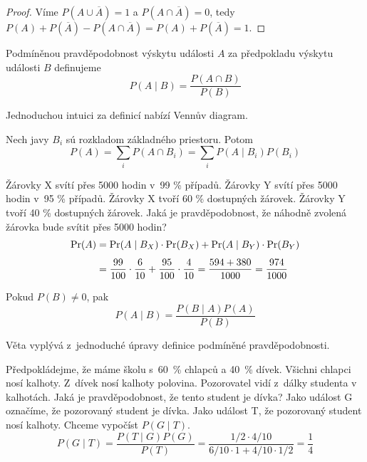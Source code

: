 {\begin{proof}
    Víme $P(A \cup \overline{A}) = 1$ a $P(A \cap \overline{A}) = 0$,
	tedy $P(A) + P(\overline{A}) - P(A \cap \overline{A}) = P(A) + P(\overline{A}) = 1$.
\end{proof}

\begin{definition}
Podmíněnou pravděpodobnost výskytu události $A$ za předpokladu výskytu
události $B$ definujeme
\[
    P(A \mid B) = \frac{P(A \cap B)}{P(B)}
\]
\end{definition}

Jednoduchou intuici za definicí nabízí Vennův diagram.

\begin{theorem}
	Nech javy $B_i$ sú rozkladom základného priestoru. Potom
    \[
        P(A) = \sum_i P(A \cap B_i) = \sum_i P(A \mid B_i) P(B_i)
    \]
\end{theorem}

\begin{example}
    Žárovky X svítí přes 5000 hodin v~99 \% případů.
    Žárovky Y svítí přes 5000 hodin v~95 \% případů.
    Žárovky X tvoří 60 \% dostupných žárovek.
    Žárovky Y tvoří 40 \% dostupných žárovek.
    Jaká je pravděpodobnost, že náhodně zvolená žárovka
    bude svítit přes 5000 hodin?
    \[
{\displaystyle {\begin{aligned}\Pr(A)&=\Pr(A\mid B_{X})\cdot \Pr(B_{X})+\Pr(A\mid B_{Y})\cdot \Pr(B_{Y})\\[4pt]&={99 \over 100}\cdot {6 \over 10}+{95 \over 100}\cdot {4 \over 10}={{594+380} \over 1000}={974 \over 1000}\end{aligned}}}
\]
\end{example}

\begin{theorem}[Bayes]
    Pokud $P(B) \neq 0$, pak
    \[
    P(A \mid B) = \frac{P(B \mid A)P(A)}{P(B)}
    \]
\end{theorem}

Věta vyplývá z~jednoduché úpravy definice podmíněné pravděpodobnosti.

\begin{example}
Předpokládejme, že máme školu s~60~\% chlapců
a 40~\% dívek. Všichni chlapci nosí kalhoty.
Z~dívek nosí kalhoty polovina. Pozorovatel vidí z~dálky studenta v kalhotách.
Jaká je pravděpodobnost, že tento student je dívka?
Jako událost G označíme, že pozorovaný student je dívka. Jako událost T,
že pozorovaný student nosí kalhoty. Chceme vypočíst $P(G \mid T)$.
\[
    P(G \mid T)
    = \frac{P(T \mid G)P(G)}{P(T)}
    = \frac{1/2 \cdot 4/10}{6/10 \cdot 1 + 4/10 \cdot 1/2}
	= \frac{1}{4}
\]
\end{example}

}
